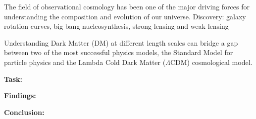 
The field of observational cosmology has been one of the major driving forces
for understanding the composition and evolution of our universe. 
Discovery: galaxy rotation curves, big bang nucleosynthesis, strong lensing and
weak lensing  

Understanding Dark Matter (DM) at different length scales can
bridge a gap between two of the most successful physics models, the Standard Model for 
particle physics and the Lambda Cold 
Dark Matter ($\Lambda$CDM) cosmological model.  

\noindent\textbf{Task:} 

\noindent\textbf{Findings:} 


\noindent\textbf{Conclusion:}

\noindent\textbf{}
